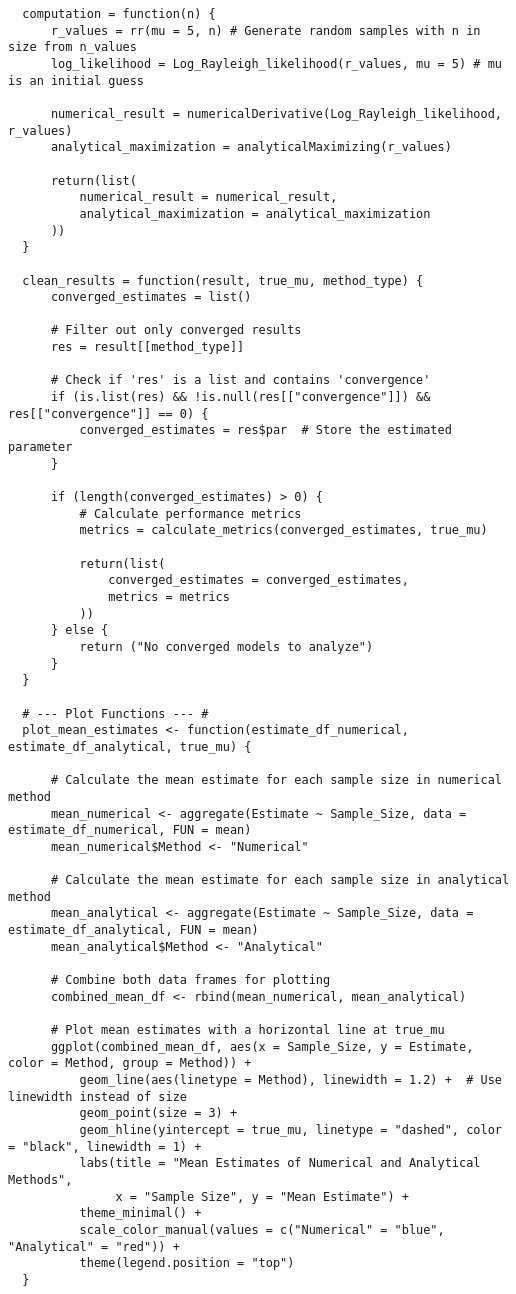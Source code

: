 \documentclass{report}
\begin{document}
\begin{verbatim}
  computation = function(n) {
      r_values = rr(mu = 5, n) # Generate random samples with n in size from n_values
      log_likelihood = Log_Rayleigh_likelihood(r_values, mu = 5) # mu is an initial guess
  
      numerical_result = numericalDerivative(Log_Rayleigh_likelihood, r_values)
      analytical_maximization = analyticalMaximizing(r_values)
  
      return(list(
          numerical_result = numerical_result, 
          analytical_maximization = analytical_maximization
      ))
  }
  
  clean_results = function(result, true_mu, method_type) {
      converged_estimates = list()
  
      # Filter out only converged results
      res = result[[method_type]]
  
      # Check if 'res' is a list and contains 'convergence'
      if (is.list(res) && !is.null(res[["convergence"]]) && res[["convergence"]] == 0) {
          converged_estimates = res$par  # Store the estimated parameter
      }
    
      if (length(converged_estimates) > 0) {
          # Calculate performance metrics
          metrics = calculate_metrics(converged_estimates, true_mu)
  
          return(list(
              converged_estimates = converged_estimates,
              metrics = metrics
          ))
      } else {
          return ("No converged models to analyze")
      }
  }
  
  # --- Plot Functions --- #
  plot_mean_estimates <- function(estimate_df_numerical, estimate_df_analytical, true_mu) {
      
      # Calculate the mean estimate for each sample size in numerical method
      mean_numerical <- aggregate(Estimate ~ Sample_Size, data = estimate_df_numerical, FUN = mean)
      mean_numerical$Method <- "Numerical"
  
      # Calculate the mean estimate for each sample size in analytical method
      mean_analytical <- aggregate(Estimate ~ Sample_Size, data = estimate_df_analytical, FUN = mean)
      mean_analytical$Method <- "Analytical"
  
      # Combine both data frames for plotting
      combined_mean_df <- rbind(mean_numerical, mean_analytical)
      
      # Plot mean estimates with a horizontal line at true_mu
      ggplot(combined_mean_df, aes(x = Sample_Size, y = Estimate, color = Method, group = Method)) +
          geom_line(aes(linetype = Method), linewidth = 1.2) +  # Use linewidth instead of size
          geom_point(size = 3) +
          geom_hline(yintercept = true_mu, linetype = "dashed", color = "black", linewidth = 1) +
          labs(title = "Mean Estimates of Numerical and Analytical Methods",
               x = "Sample Size", y = "Mean Estimate") +
          theme_minimal() +
          scale_color_manual(values = c("Numerical" = "blue", "Analytical" = "red")) +
          theme(legend.position = "top")
  }
  

\end{verbatim}
\end{document}
